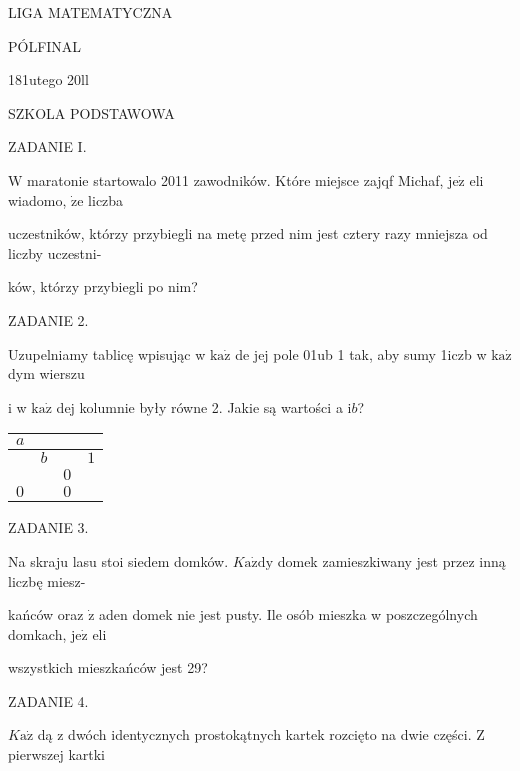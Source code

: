 \documentclass[a4paper,12pt]{article}
\begin{document}
LIGA MATEMATYCZNA

PÓLFINAL

181utego 20ll

SZKOLA PODSTAWOWA

ZADANIE I.

$\mathrm{W}$ maratonie startowalo 2011 zawodników. Które miejsce zajqf Michaf, $\mathrm{j}\mathrm{e}\dot{\mathrm{z}}$ eli wiadomo, $\dot{\mathrm{z}}\mathrm{e}$ liczba

uczestników, którzy przybiegli na metę przed nim jest cztery razy mniejsza od liczby uczestni-

ków, którzy przybiegli po nim?

ZADANIE 2.

Uzupelniamy tablicę wpisując w $\mathrm{k}\mathrm{a}\dot{\mathrm{z}}$ de jej pole 01ub 1 tak, aby sumy 1iczb w $\mathrm{k}\mathrm{a}\dot{\mathrm{z}}$ dym wierszu

i w $\mathrm{k}\mathrm{a}\dot{\mathrm{z}}$ dej kolumnie były równe 2. Jakie są wartości a $\mathrm{i}b$?
\begin{center}
\begin{tabular}{|l|l|l|l|}
\hline
\multicolumn{1}{|l|}{$a$}&	\multicolumn{1}{|l|}{}&	\multicolumn{1}{|l|}{}&	\multicolumn{1}{|l|}{}	\\
\hline
\multicolumn{1}{|l|}{}&	\multicolumn{1}{|l|}{ $b$}&	\multicolumn{1}{|l|}{}&	\multicolumn{1}{|l|}{ $1$}	\\
\hline
\multicolumn{1}{|l|}{}&	\multicolumn{1}{|l|}{}&	\multicolumn{1}{|l|}{ $0$}&	\multicolumn{1}{|l|}{}	\\
\hline
\multicolumn{1}{|l|}{ $0$}&	\multicolumn{1}{|l|}{}&	\multicolumn{1}{|l|}{ $0$}&	\multicolumn{1}{|l|}{}	\\
\hline
\end{tabular}

\end{center}
ZADANIE 3.

Na skraju lasu stoi siedem domków. $K\mathrm{a}\dot{\mathrm{z}}\mathrm{d}\mathrm{y}$ domek zamieszkiwany jest przez inną liczbę miesz-

kańców oraz $\dot{\mathrm{z}}$ aden domek nie jest pusty. Ile osób mieszka w poszczególnych domkach, $\mathrm{j}\mathrm{e}\dot{\mathrm{z}}$ eli

wszystkich mieszkańców jest 29?

ZADANIE 4.

$K\mathrm{a}\dot{\mathrm{z}}$ dą z dwóch identycznych prostokątnych kartek rozcięto na dwie części. $\mathrm{Z}$ pierwszej kartki
\end{document}
